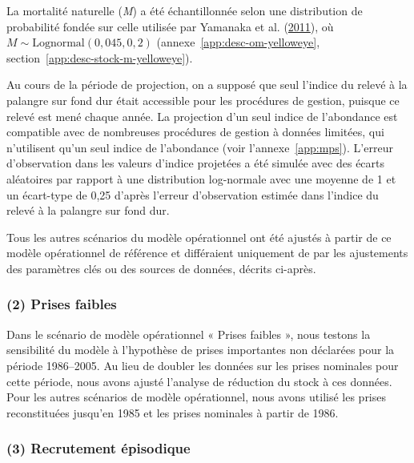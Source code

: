 \documentclass[french,11pt]{book}
\begin{document}
La mortalité naturelle (\emph{M}) a été échantillonnée selon une distribution de probabilité fondée sur celle utilisée par Yamanaka et al. (\protect\hyperlink{ref-yamanaka2011}{2011}), où \(M \sim \textrm{Lognormal}(0,045, 0,2)\) (annexe~\ref{app:desc-om-yelloweye}, section~\ref{app:desc-stock-m-yelloweye}).

Au cours de la période de projection, on a supposé que seul l'indice du relevé à la palangre sur fond dur était accessible pour les procédures de gestion, puisque ce relevé est mené chaque année. La projection d'un seul indice de l'abondance est compatible avec de nombreuses procédures de gestion à données limitées, qui n'utilisent qu'un seul indice de l'abondance (voir l'annexe~\ref{app:mps}). L'erreur d'observation dans les valeurs d'indice projetées a été simulée avec des écarts aléatoires par rapport à une distribution log-normale avec une moyenne de 1 et un écart-type de 0,25 d'après l'erreur d'observation estimée dans l'indice du relevé à la palangre sur fond dur.

Tous les autres scénarios du modèle opérationnel ont été ajustés à partir de ce modèle opérationnel de référence et différaient uniquement de par les ajustements des paramètres clés ou des sources de données, décrits ci-après.

\hypertarget{sec:approach3-reference2}{%
\subsubsection{(2) Prises faibles}\label{sec:approach3-reference2}}

Dans le scénario de modèle opérationnel « Prises faibles », nous testons la sensibilité du modèle à l'hypothèse de prises importantes non déclarées pour la période 1986--2005. Au lieu de doubler les données sur les prises nominales pour cette période, nous avons ajusté l'analyse de réduction du stock à ces données. Pour les autres scénarios de modèle opérationnel, nous avons utilisé les prises reconstituées jusqu'en 1985 et les prises nominales à partir de 1986.

\hypertarget{sec:approach3-reference3}{%
\subsubsection{(3) Recrutement épisodique}\label{sec:approach3-reference3}}
\end{document}
